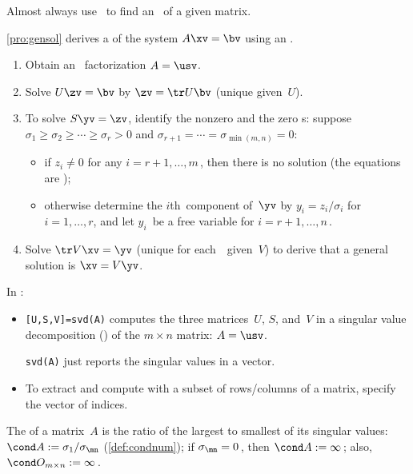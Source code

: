 \begin{itemize}
Almost always use \script\ to find an \svd\ of a given matrix.

\itemhi \cref{pro:gensol} derives a  of the system $A\xv=\bv$ using an \svd.
\begin{enumerate}
\item Obtain an \svd\ factorization \(A=\usv\).
\item Solve \(U\zv=\bv\) by $\zv=\tr U\bv$ (unique given~\(U\)).
\item To solve \(S\yv=\zv\), identify the nonzero and the zero s: suppose \(\sigma_1\geq\sigma_2\geq\cdots\geq\sigma_r>0\) and \(\sigma_{r+1}=\cdots=\sigma_{\min(m,n)}=0\):
\begin{itemize}
\item if $z_i\neq0$ for any \(i=r+1,\ldots,m\)\,, then there is {no solution} (the equations are );
\item otherwise determine the $i$th~component of~$\yv$ by
$y_i=z_i/\sigma_i$ for $i=1,\ldots,r$, and let $y_i$~be a {free variable} for $i=r+1,\ldots,n$\,. 
\end{itemize}

\item Solve \(\tr V\xv=\yv\) (unique for each~\yv\ given~\(V\)) to derive that a general solution is $\xv=V\yv$.
\end{enumerate}

\itemhi In \script:
\begin{itemize}
\item {}\verb|[U,S,V]=svd(A)| computes the three matrices~\(U\), \(S\), and~\(V\) in a singular value decomposition (\svd) of the \(m\times n\) matrix: \(A=\usv\).

\verb|svd(A)| just reports the singular values in a vector.

\item To extract and compute with a subset of rows\slash columns of a matrix, specify the vector of indices.
\end{itemize}


\itemme The  of a matrix~\(A\) is the ratio of the largest to smallest of its {singular value}s: \(\cond A:=\sigma_1/\sigma_{\mn}\) (\cref{def:condnum}); 
if \(\sigma_{\mn}=0\)\,, then \(\cond A:=\infty\)\,; 
also, \(\cond O_{m\times n}:=\infty\)\,.


\end{itemize}
